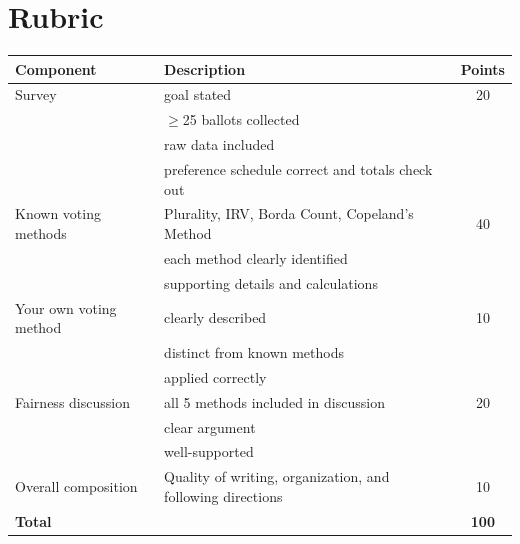 \documentclass[11pt]{article}
\begin{document}
\vspace{1in}

\section*{Rubric}

\begin{center}
\renewcommand{\arraystretch}{1.3}
\begin{tabular}{l p{9cm}c}
\toprule
\textbf{Component} & \textbf{Description}& \textbf{Points} \\
\midrule
Survey& goal stated& 20\\
& $\geq$25 ballots collected&\\
&raw data included&\\
& preference schedule correct and totals check out&  \\
\hline
Known voting methods&Plurality, IRV, Borda Count, Copeland's Method  & 40 \\
& each method clearly identified&\\
& supporting details and calculations&\\
\hline
Your own voting method& clearly described & 10 \\
& distinct from known methods&\\
&applied correctly&\\
\hline
Fairness discussion& all 5 methods included in discussion& 20 \\
&clear argument&\\
&well-supported&\\
\hline
Overall composition& Quality of writing, organization, and following directions & 10 \\
\midrule
\textbf{Total} && \textbf{100} \\
\bottomrule
\end{tabular}
\end{center}
\newpage
\end{document}
